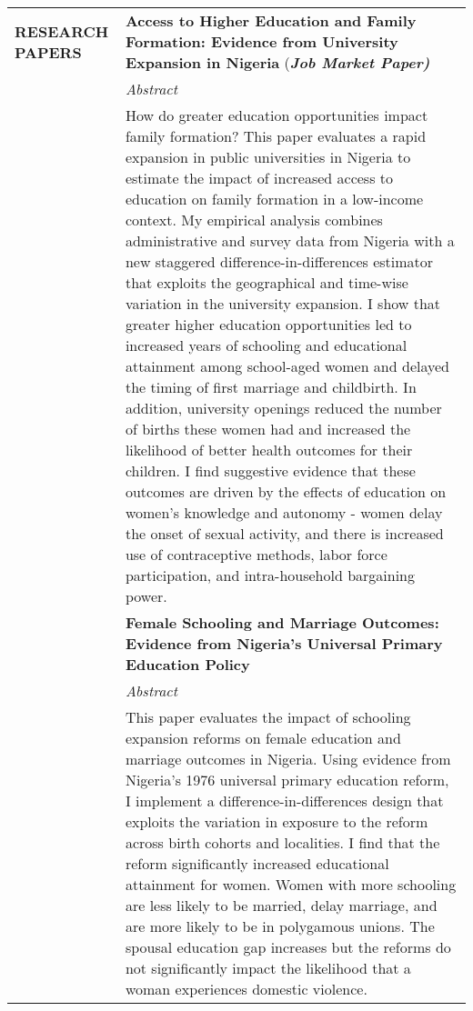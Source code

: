 \documentclass[letterpaper, 11pt]{article}
\begin{document}
\begin{longtable}{p{1.2in}p{4.8in}}
\nohyphens{{\textbf{RESEARCH PAPERS}}} 
& \textbf{\color{Blue}Access to Higher Education and Family Formation: Evidence from University Expansion in Nigeria } (\textit{\textbf{Job Market Paper)}} \\
& \textit{Abstract} \\
& How do greater education opportunities impact family formation? This paper evaluates a rapid expansion in public universities in Nigeria to estimate the impact of increased access to education on family formation in a low-income context. My empirical analysis combines administrative and survey data from Nigeria with a new staggered difference-in-differences estimator that exploits the geographical and time-wise variation in the university expansion. I show that greater higher education opportunities led to increased years of schooling and educational attainment among school-aged women and delayed the timing of first marriage and childbirth. In addition, university openings reduced the number of births these women had and increased the likelihood of better health outcomes for their children. I find suggestive evidence that these outcomes are driven by the effects of education on women's knowledge and autonomy - women delay the onset of sexual activity, and there is increased use of contraceptive methods, labor force participation, and intra-household bargaining power.
& \\

& \textbf{\color{Blue}Female Schooling and Marriage Outcomes: Evidence from Nigeria’s Universal Primary Education Policy} \\
& \textit{Abstract} \\
& This paper evaluates the impact of schooling expansion reforms on female education and marriage outcomes in Nigeria. Using evidence from Nigeria’s 1976 universal primary education reform, I implement a difference-in-differences design that exploits the variation in exposure to the reform across birth cohorts and localities. I find that the reform significantly increased educational attainment for women. Women with more schooling are less likely to be married, delay marriage, and are more likely to be in polygamous unions. The spousal education gap increases but the reforms do not significantly impact the likelihood that a woman experiences domestic violence. 
& \\


\end{longtable}
\end{document}
